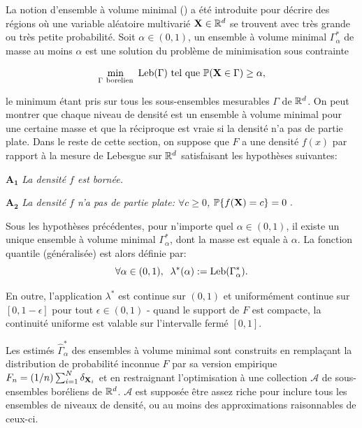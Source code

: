 La notion d'ensemble à volume minimal (\cite{Polonik97, Einmahl1992}) a été introduite pour décrire des régions où une variable aléatoire multivarié $\mathbf X \in \mathbb{R}^d$  se trouvent avec très grande ou très petite probabilité. Soit $\alpha \in (0,1)$, un ensemble à volume minimal $\Gamma^*_{\alpha}$ de masse au moins $\alpha $ est une solution du problème de minimisation sous contrainte

\begin{equation}\label{resume_fr:eq:MV}\min_{\Gamma~ \text{borelien}} ~\text{Leb}(\Gamma) \mbox{~tel que~} \mathbb{P}(\mathbf X \in \Gamma) \ge \alpha,
\end{equation}

le minimum étant pris sur tous les sous-ensembles mesurables $ \Gamma $ de $ \mathbb{R}^d $.
On peut montrer que chaque niveau de densité est un ensemble à volume minimal pour une certaine masse et que la réciproque est vraie si la densité n'a pas de partie plate.
Dans le reste de cette section, on suppose que $F$ a une densité $ f(x) $ par rapport à la mesure de Lebesgue sur $ \mathbb{R}^d $ satisfaisant les hypothèses suivantes:

\noindent $\mathbf{A_1}$ {\it La densité $f$ est bornée.}%

\noindent $\mathbf{A_2}$ {\it La densité $f$ n'a pas de partie plate: $\forall c\geq 0$, $\mathbb{P}\{f(\mathbf X)=c\}=0~.$}

Sous les hypothèses précédentes, pour n'importe quel $\alpha\in (0,1)$, il existe un unique ensemble à volume minimal $\Gamma_\alpha^*$, dont la masse est equale à $\alpha$.
La fonction quantile (généralisée) est alors définie par:
$$
\forall \alpha\in (0,1),\;\; \lambda^*(\alpha) := \text{Leb}(\Gamma^*_{\alpha}).
$$

En outre, l'application $ \lambda^* $ est continue sur $(0,1)$ et uniformément continue sur $ [0,1- \epsilon] $ pour tout $ \epsilon \in (0,1) $ - quand le support de $ F $ est compacte, la continuité uniforme est valable sur l'intervalle fermé $[0,1] $.


Les estimés $ \widehat {\Gamma}^*_{\alpha} $ des ensembles à volume minimal sont construits en remplaçant la distribution de probabilité inconnue $ F $ par sa version empirique $ F_n = (1 / n) \sum_ {i = 1} ^ N \delta _ {\mathbf X_i} $ et en restraignant l'optimisation à une collection $ \mathcal{A} $ de sous-ensembles boréliens de $ \mathbb{R}^d $. $ \mathcal {A} $ est supposée être assez riche pour inclure tous les ensembles de niveaux de densité, ou au moins des approximations raisonnables de ceux-ci.

